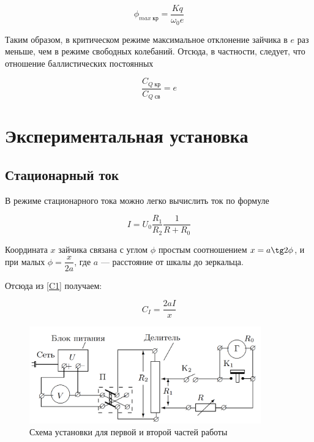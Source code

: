 \documentclass[12pt]{kiarticle}
\begin{document}
	\begin{equation}\label{}
	\phi_{max \; кр} = \dfrac{Kq}{\omega_0 e}
	\end{equation}
	
	Таким образом, в критическом режиме максимальное отклонение зайчика в $ e $ раз меньше, чем в режиме свободных колебаний. Отсюда, в частности,  следует, что отношение баллистических постоянных
	
	\begin{equation}\label{}
	\dfrac{C_{Q \; кр}}{C_{Q \; св}} = e
	\end{equation}
	
	
	
	\section{Экспериментальная установка}

	\subsection{Стационарный ток}
	
	В режиме стационарного тока можно легко вычислить ток по формуле 
	
	\begin{equation}\label{I}
	I = U_0 \dfrac{R_1}{R_2} \dfrac{1}{R + R_0}
	\end{equation}
	
	Координата $ x $ зайчика связана с углом $ \phi $ простым соотношением $ x = a\tg 2\phi $, и при малых $ \phi  =  \dfrac{x}{2a}$, где $ a $ --- расстояние от шкалы до зеркальца. 
	
	Отсюда из \eqref{C1} получаем:
	
	\begin{equation}\label{C1exp}
	C_I = \dfrac{2aI}{x}
	\end{equation}
	
			\begin{figure} 
		\includegraphics[width=10cm]{scheme1}
		\caption{Схема установки для первой и второй частей работы}
		\label{chain1}
	\end{figure}
	
\end{document}
